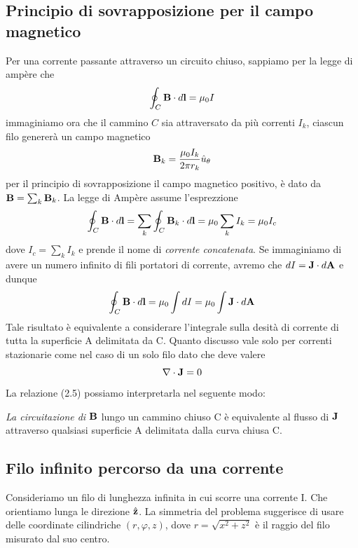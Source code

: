 \subsection{Principio di sovrapposizione per il campo magnetico}
Per una corrente passante attraverso un circuito chiuso, sappiamo per la legge di amp\`ere che 
\begin{equation*}
	\oint_{C} \bold{B} \cdot d\bold{l} = \mu_0 I
\end{equation*}
immaginiamo ora che il cammino $C$ sia attraversato da pi\`u correnti $I_k$, ciascun filo generer\`a un campo magnetico
\begin{equation*}
	\bold{B}_k =\frac{\mu_0 I_k}{2 \pi r_k}\hat{u}_{\theta}
\end{equation*}
per il principio di sovrapposizione il campo magnetico positivo, \`e dato da $\bold{B} = \sum_{k} \bold{B}_k$. La legge di Amp\`ere assume l'esprezzione
\begin{equation*}
	\oint_{C} \bold{B} \cdot d\bold{l} = \sum_{k} \oint_{C} \bold{B}_k \cdot d\bold{l} = \mu_0 \sum_{k}I_k = \mu_0 I_{c}
\end{equation*}
dove $I_c = \sum_k I_k$ e prende il nome di \textit{corrente concatenata}. Se immaginiamo di avere un numero infinito di fili portatori di corrente, avremo che $dI = \bold{J} \cdot d\bold{A}$ e dunque 
\begin{equation}
	\oint_{C} \bold{B} \cdot d \bold{l} = \mu_0 \int dI  = \mu_0 \int \bold{J} \cdot d\bold{A}
\end{equation}
Tale risultato \`e equivalente a considerare l'integrale sulla desit\`a di corrente di tutta la superficie A delimitata da C. Quanto discusso vale solo per correnti stazionarie come nel caso di un solo filo dato che deve valere 
\begin{equation*}
	\nabla \cdot \bold{J} = 0 
\end{equation*}
La relazione (2.5) possiamo interpretarla nel seguente modo:
\begin{center}
	\textit{La circuitazione di $\bold{B}$} lungo un cammino chiuso C \`e equivalente al flusso di $\bold{J}$ attraverso qualsiasi superficie A delimitata dalla curva chiusa C.
\end{center}
\subsection{Filo infinito percorso da una corrente}

Consideriamo un filo di lunghezza infinita in cui scorre una corrente I. Che orientiamo lunga le direzione $\hat{\bold{z}}$. La simmetria del problema suggerisce di usare delle coordinate cilindriche $(r,\varphi,z)$, dove $r = \sqrt{x^2 + z^2}$ \`e il raggio del filo misurato dal suo centro.
\newline


